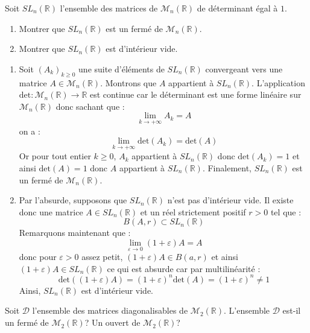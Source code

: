 \documentclass[a4paper,10pt]{report}
\begin{document}
\begin{Exa} Soit $SL_n(\mathbb{R})$ l'ensemble des matrices de $\mathcal{M}_n(\mathbb{R})$ de déterminant égal à $1$.
\begin{enumerate}
\item Montrer que $SL_n(\mathbb{R})$ est un fermé de $\mathcal{M}_n(\mathbb{R})$.
\item Montrer que $SL_n(\mathbb{R})$ est d'intérieur vide.
\end{enumerate}
\end{Exa}

\corr 

\begin{enumerate}
\item Soit $(A_k)_{k \geq 0}$ une suite d'éléments de $SL_n(\mathbb{R})$ convergeant vers une matrice $A \in \mathcal{M}_n(\mathbb{R})$. Montrons que $A$ appartient à $SL_n(\mathbb{R})$. L'application $\textrm{det} : \mathcal{M}_n(\mathbb{R}) \rightarrow \mathbb{R}$ est continue car le déterminant est une forme linéaire sur $\mathcal{M}_n(\mathbb{R})$ donc sachant que  :
$$ \lim_{k \rightarrow + \infty} A_k = A$$
on a :
$$ \lim_{k \rightarrow + \infty} \textrm{det}(A_k) = \textrm{det}(A)$$
Or pour tout entier $k \geq 0$, $A_k$ appartient à $SL_n(\mathbb{R})$ donc $\textrm{det}(A_k)=1$ et ainsi $\textrm{det}(A)=1$ donc $A$ appartient à $SL_n(\mathbb{R})$. Finalement, $SL_n(\mathbb{R})$ est un fermé de $\mathcal{M}_n(\mathbb{R})$.
\item Par l'absurde, supposons que $SL_n(\mathbb{R})$ n'est pas d'intérieur vide. Il existe donc une matrice $A \in SL_n(\mathbb{R})$ et un réel strictement positif $r>0$ tel que :
$$ B(A,r) \subset SL_n(\mathbb{R})$$
Remarquons maintenant que :
$$ \lim_{\varepsilon \rightarrow 0} (1+ \varepsilon) A= A$$
donc pour $\varepsilon>0$ assez petit, $(1+ \varepsilon) A \in B(a,r)$ et ainsi $(1+ \varepsilon) A \in SL_n(\mathbb{R})$ ce qui est absurde car par multilinéarité : 
$$ \textrm{det}((1+ \varepsilon)A)= (1+\varepsilon)^n \textrm{det}(A) = (1+\varepsilon)^n \neq 1$$
Ainsi, $SL_n(\mathbb{R})$ est d'intérieur vide.
\end{enumerate}

\begin{Exa} Soit $\mathcal{D}$ l'ensemble des matrices diagonalisables de $\mathcal{M}_2(\mathbb{R})$. L'ensemble $\mathcal{D}$ est-il un fermé de $\mathcal{M}_2(\mathbb{R})$? Un ouvert de $\mathcal{M}_2(\mathbb{R})$?
\end{Exa}
\end{document}
